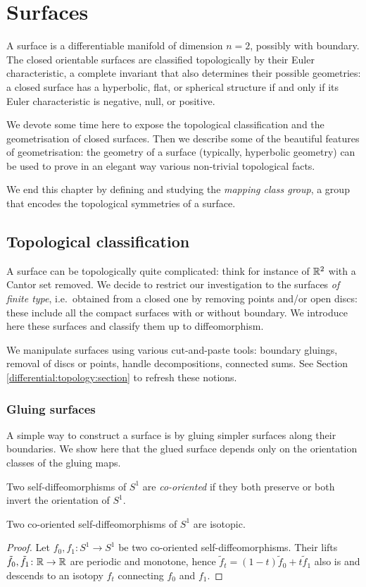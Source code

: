 \chapter{Surfaces} \label{superfici:chapter} \label{surfaces:chapter}

A surface is a differentiable manifold of dimension $n=2$, possibly with boundary. The closed orientable surfaces are classified topologically by their Euler characteristic, a complete invariant that also determines their possible geometries: a closed surface has a hyperbolic, flat, or spherical structure if and only if its Euler characteristic is negative, null, or positive.

We devote some time here to expose the topological classification and the geometrisation of closed surfaces. Then we describe some of the beautiful features of geometrisation: the geometry of a surface (typically, hyperbolic geometry) can be used to prove in an elegant way various non-trivial topological facts. 

We end this chapter by defining and studying the \emph{mapping class group}, a group that encodes the topological symmetries of a surface.

\section{Topological classification}
A surface can be topologically quite complicated: think for instance of $\mathbb{R}^2$ with a Cantor set removed. We decide to restrict our investigation to the surfaces \emph{of finite type}, i.e.~obtained from a closed one by removing points and/or open discs: these include all the compact surfaces with or without boundary.
We introduce here these surfaces and classify them up to diffeomorphism.

We manipulate surfaces using various cut-and-paste tools: boundary gluings, removal of discs or points, handle decompositions, connected sums. See Section \ref{differential:topology:section} to refresh these notions.

\subsection{Gluing surfaces}
A simple way to construct a surface is by gluing simpler surfaces along their boundaries. We show here that the glued surface depends only on the orientation classes of the gluing maps.

Two self-diffeomorphisms of $S^1$ are \emph{co-oriented} if they both preserve or both invert the orientation of $S^1$.
\begin{lemma} \label{diffeo:isotopi:lemma}
Two co-oriented self-diffeomorphisms of $S^1$ are isotopic.
\end{lemma}
\begin{proof}
Let $f_0, f_1\colon S^1 \to S^1$ be two co-oriented self-diffeomorphisms. Their lifts $\tilde f_0, \tilde f_1\colon \mathbb{R}\to\mathbb{R}$ are periodic and monotone, hence $\tilde f_t = (1-t)\tilde f_0 + t\tilde f_1$ also is and descends to an isotopy $f_t$ connecting $f_0$ and $f_1$.
\end{proof}

